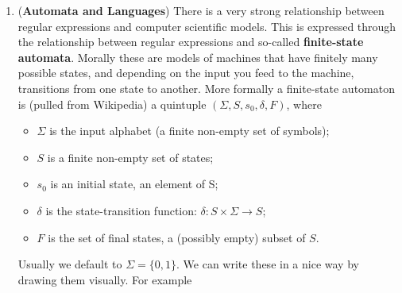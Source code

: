 \documentclass{article}
\newcommand{\question}[1]{\item (\textbf{#1})}
\theoremstyle{remark}
\begin{document}
\begin{enumerate}
    \question{Automata and Languages}
    There is a very strong relationship between regular expressions and computer scientific models. This is expressed through the relationship between regular expressions and so-called \textbf{finite-state automata}. Morally these are models of machines that have finitely many possible states, and depending on the input you feed to the machine, transitions from one state to another. More formally a finite-state automaton is (pulled from Wikipedia) a quintuple $(\Sigma , S , s_0 , \delta, F)$, where
    \begin{itemize}
        \item $\Sigma$ is the input alphabet (a finite non-empty set of symbols);
        \item $S$ is a finite non-empty set of states;
        \item $s_{0}$ is an initial state, an element of S;
        \item $\delta$ is the state-transition function: $\delta : S \times \Sigma \to S$;
        \item $F$ is the set of final states, a (possibly empty) subset of $S$.
    \end{itemize}
    Usually we default to $\Sigma = \{ 0,1 \}$. We can write these in a nice way by drawing them visually. For example
    \begin{center}
\end{center}
\end{enumerate}
\end{document}
